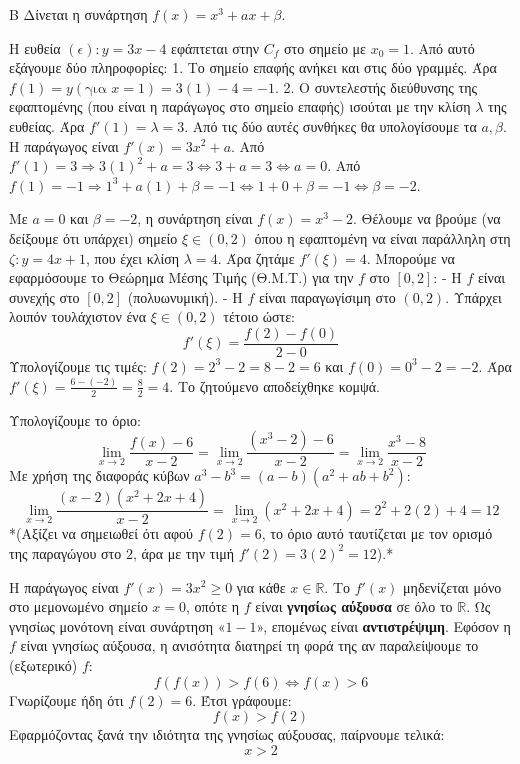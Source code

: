 \begin{thema}{Β}
Δίνεται η συνάρτηση $f(x) = x^3 + a x + \beta$.
\begin{erwthma}
\item Η ευθεία $(\epsilon): y = 3x - 4$ εφάπτεται στην $C_f$ στο σημείο με $x_0=1$.
Από αυτό εξάγουμε δύο πληροφορίες:
1. Το σημείο επαφής ανήκει και στις δύο γραμμές. Άρα $f(1) = y(\text{για } x=1) = 3(1)-4 = -1$.
2. Ο συντελεστής διεύθυνσης της εφαπτομένης (που είναι η παράγωγος στο σημείο επαφής) ισούται με την κλίση $\lambda$ της ευθείας. Άρα $f'(1) = \lambda = 3$.
Από τις δύο αυτές συνθήκες θα υπολογίσουμε τα $a, \beta$.
Η παράγωγος είναι $f'(x) = 3x^2 + a$.
Από $f'(1) = 3 \Rightarrow 3(1)^2 + a = 3 \Leftrightarrow 3 + a = 3 \Leftrightarrow a = 0$.
Από $f(1) = -1 \Rightarrow 1^3 + a(1) + \beta = -1 \Leftrightarrow 1 + 0 + \beta = -1 \Leftrightarrow \beta = -2$.

\item Με $a=0$ και $\beta=-2$, η συνάρτηση είναι $f(x) = x^3 - 2$.
Θέλουμε να βρούμε (να δείξουμε ότι υπάρχει) σημείο $\xi \in (0, 2)$ όπου η εφαπτομένη να είναι παράλληλη στη $\zeta: y = 4x+1$, που έχει κλίση $\lambda = 4$. Άρα ζητάμε $f'(\xi) = 4$.
Μπορούμε να εφαρμόσουμε το Θεώρημα Μέσης Τιμής (Θ.Μ.Τ.) για την $f$ στο $[0, 2]$:
- Η $f$ είναι συνεχής στο $[0, 2]$ (πολυωνυμική).
- Η $f$ είναι παραγωγίσιμη στο $(0, 2)$.
Υπάρχει λοιπόν τουλάχιστον ένα $\xi \in (0, 2)$ τέτοιο ώστε:
\[ f'(\xi) = \frac{f(2) - f(0)}{2 - 0} \]
Υπολογίζουμε τις τιμές: $f(2) = 2^3 - 2 = 8 - 2 = 6$ και $f(0) = 0^3 - 2 = -2$.
Άρα $f'(\xi) = \frac{6 - (-2)}{2} = \frac{8}{2} = 4$. Το ζητούμενο αποδείχθηκε κομψά.

\item Υπολογίζουμε το όριο:
\[ \lim_{x\to2} \frac{f(x)-6}{x-2} = \lim_{x\to2} \frac{(x^3-2)-6}{x-2} = \lim_{x\to2} \frac{x^3-8}{x-2} \]
Με χρήση της διαφοράς κύβων $a^3-b^3 = (a-b)(a^2+ab+b^2)$:
\[ \lim_{x\to2} \frac{(x-2)(x^2+2x+4)}{x-2} = \lim_{x\to2} (x^2+2x+4) = 2^2 + 2(2) + 4 = 12 \]
*(Αξίζει να σημειωθεί ότι αφού $f(2) = 6$, το όριο αυτό ταυτίζεται με τον ορισμό της παραγώγου στο $2$, άρα με την τιμή $f'(2) = 3(2)^2 = 12$).*

\item Η παράγωγος είναι $f'(x) = 3x^2 \ge 0$ για κάθε $x \in \mathbb{R}$. Το $f'(x)$ μηδενίζεται μόνο στο μεμονωμένο σημείο $x=0$, οπότε η $f$ είναι \textbf{γνησίως αύξουσα} σε όλο το $\mathbb{R}$.
Ως γνησίως μονότονη είναι συνάρτηση «$1-1$», επομένως είναι \textbf{αντιστρέψιμη}.
Εφόσον η $f$ είναι γνησίως αύξουσα, η ανισότητα διατηρεί τη φορά της αν παραλείψουμε το (εξωτερικό) $f$:
\[ f(f(x)) > f(6) \Leftrightarrow f(x) > 6 \]
Γνωρίζουμε ήδη ότι $f(2) = 6$. Έτσι γράφουμε:
\[ f(x) > f(2) \]
Εφαρμόζοντας ξανά την ιδιότητα της γνησίως αύξουσας, παίρνουμε τελικά:
\[ x > 2 \]
\end{erwthma}
\end{thema}

